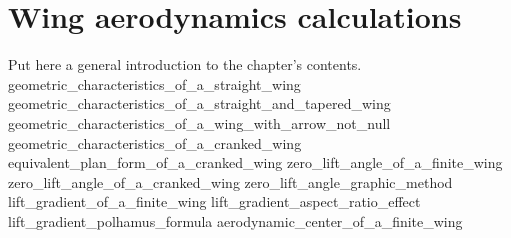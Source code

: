 \documentclass[[12pt,twoside]{book}
\begin{document}
%
%
\chapter%
   [Wing aerodynamics calculations]%
   {Wing aerodynamics calculations}
\label{chap:Wing}

\setcounter{minitocdepth}{2}%
\minitoc %

\vspace{\baselineskip}

\noindent
Put here a general introduction to the chapter's contents.
%
{geometric_characteristics_of_a_straight_wing}
{geometric_characteristics_of_a_straight_and_tapered_wing}
{geometric_characteristics_of_a_wing_with_arrow_not_null}
{geometric_characteristics_of_a_cranked_wing}
{equivalent_plan_form_of_a_cranked_wing}
{zero_lift_angle_of_a_finite_wing}
{zero_lift_angle_of_a_cranked_wing}
{zero_lift_angle_graphic_method}
{lift_gradient_of_a_finite_wing}
{lift_gradient_aspect_ratio_effect}
{lift_gradient_polhamus_formula}
{aerodynamic_center_of_a_finite_wing}
\end{document}
